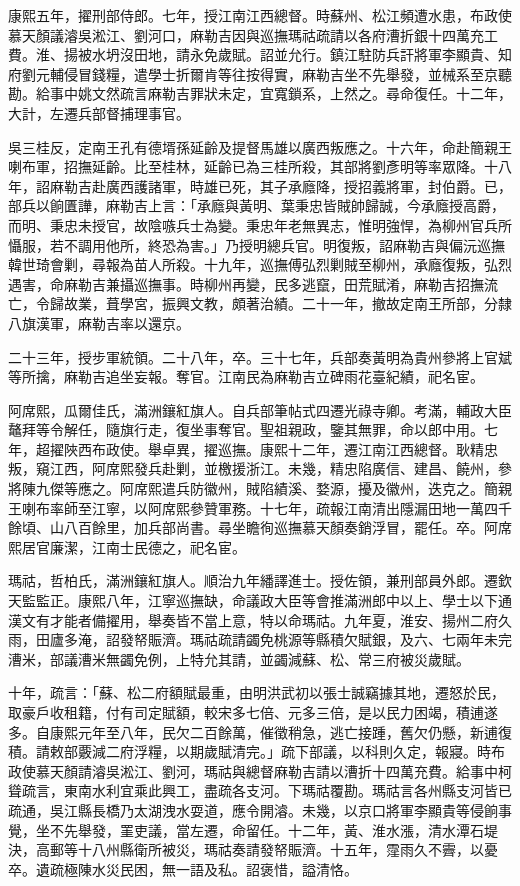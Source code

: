 \begin{pinyinscope}
康熙五年，擢刑部侍郎。七年，授江南江西總督。時蘇州、松江頻遭水患，布政使慕天顏議濬吳淞江、劉河口，麻勒吉因與巡撫瑪祜疏請以各府漕折銀十四萬充工費。淮、揚被水坍沒田地，請永免歲賦。詔並允行。鎮江駐防兵訐將軍李顯貴、知府劉元輔侵冒錢糧，遣學士折爾肯等往按得實，麻勒吉坐不先舉發，並械系至京聽勘。給事中姚文然疏言麻勒吉罪狀未定，宜寬鎖系，上然之。尋命復任。十二年，大計，左遷兵部督捕理事官。

吳三桂反，定南王孔有德壻孫延齡及提督馬雄以廣西叛應之。十六年，命赴簡親王喇布軍，招撫延齡。比至桂林，延齡已為三桂所殺，其部將劉彥明等率眾降。十八年，詔麻勒吉赴廣西護諸軍，時雄已死，其子承廕降，授招義將軍，封伯爵。已，部兵以餉匱譁，麻勒吉上言：「承廕與黃明、葉秉忠皆賊帥歸誠，今承廕授高爵，而明、秉忠未授官，故陰嗾兵士為變。秉忠年老無異志，惟明強悍，為柳州官兵所懾服，若不調用他所，終恐為害。」乃授明總兵官。明復叛，詔麻勒吉與偏沅巡撫韓世琦會剿，尋報為苗人所殺。十九年，巡撫傅弘烈剿賊至柳州，承廕復叛，弘烈遇害，命麻勒吉兼攝巡撫事。時柳州再變，民多逃竄，田荒賦淆，麻勒吉招撫流亡，令歸故業，葺學宮，振興文教，頗著治績。二十一年，撤故定南王所部，分隸八旗漢軍，麻勒吉率以還京。

二十三年，授步軍統領。二十八年，卒。三十七年，兵部奏黃明為貴州參將上官斌等所擒，麻勒吉追坐妄報。奪官。江南民為麻勒吉立碑雨花臺紀績，祀名宦。

阿席熙，瓜爾佳氏，滿洲鑲紅旗人。自兵部筆帖式四遷光祿寺卿。考滿，輔政大臣鼇拜等令解任，隨旗行走，復坐事奪官。聖祖親政，鑒其無罪，命以郎中用。七年，超擢陜西布政使。舉卓異，擢巡撫。康熙十二年，遷江南江西總督。耿精忠叛，窺江西，阿席熙發兵赴剿，並檄援浙江。未幾，精忠陷廣信、建昌、饒州，參將陳九傑等應之。阿席熙遣兵防徽州，賊陷績溪、婺源，擾及徽州，迭克之。簡親王喇布率師至江寧，以阿席熙參贊軍務。十七年，疏報江南清出隱漏田地一萬四千餘頃、山八百餘里，加兵部尚書。尋坐瞻徇巡撫慕天顏奏銷浮冒，罷任。卒。阿席熙居官廉潔，江南士民德之，祀名宦。

瑪祜，哲柏氏，滿洲鑲紅旗人。順治九年繙譯進士。授佐領，兼刑部員外郎。遷欽天監監正。康熙八年，江寧巡撫缺，命議政大臣等會推滿洲郎中以上、學士以下通漢文有才能者備擢用，舉奏皆不當上意，特以命瑪祜。九年夏，淮安、揚州二府久雨，田廬多淹，詔發帑賑濟。瑪祜疏請蠲免桃源等縣積欠賦銀，及六、七兩年未完漕米，部議漕米無蠲免例，上特允其請，並蠲減蘇、松、常三府被災歲賦。

十年，疏言：「蘇、松二府額賦最重，由明洪武初以張士誠竊據其地，遷怒於民，取豪戶收租籍，付有司定賦額，較宋多七倍、元多三倍，是以民力困竭，積逋遂多。自康熙元年至八年，民欠二百餘萬，催徵稍急，逃亡接踵，舊欠仍懸，新逋復積。請敕部覈減二府浮糧，以期歲賦清完。」疏下部議，以科則久定，報寢。時布政使慕天顏請濬吳淞江、劉河，瑪祜與總督麻勒吉請以漕折十四萬充費。給事中柯聳疏言，東南水利宜乘此興工，盡疏各支河。下瑪祜覆勘。瑪祜言各州縣支河皆已疏通，吳江縣長橋乃太湖洩水耍道，應令開濬。未幾，以京口將軍李顯貴等侵餉事覺，坐不先舉發，罣吏議，當左遷，命留任。十二年，黃、淮水漲，清水潭石堤決，高郵等十八州縣衛所被災，瑪祜奏請發帑賑濟。十五年，霪雨久不霽，以憂卒。遺疏極陳水災民困，無一語及私。詔褒惜，謚清恪。


\end{pinyinscope}
